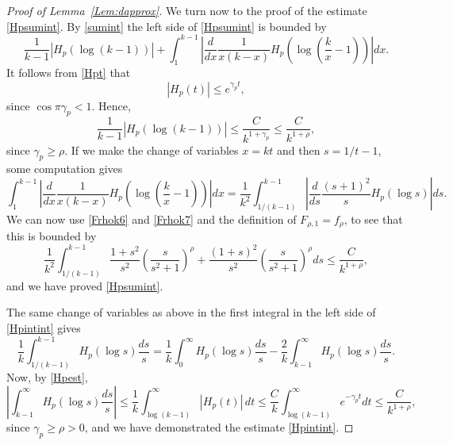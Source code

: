 \documentclass{article}
\numberwithin{equation}{section}
\numberwithin{figure}{section}
\theoremstyle{plain}
\theoremstyle{plain}
\numberwithin{thm}{section}
\theoremstyle{remark}
\let \le \leqslant
\let \ge \geqslant
\begin{document}
\begin{proof}[Proof of Lemma~\ref{Lem:dapprox}]
We turn now to the proof of the estimate \eqref{Hpsumint}. By \eqref{sumint} the left side of \eqref{Hpsumint} is bounded by
\begin{equation*}
    \frac 1{k-1}|H_p(\log(k-1))|+\int_1^{k-1}\left|\frac{d}{dx}\frac 1{x(k-x)}H_p(\log(\frac kx-1))\right|dx.
\end{equation*}
It follows from \eqref{Hpt} that
\begin{equation}\label{Hpest}
    |H_p(t)|\le e^{\gamma_pt},
\end{equation}
since $\cos\pi\gamma_p<1$. Hence,
\begin{equation*}
 \frac 1{k-1}|H_p(\log(k-1))|\le \frac{C}{k^{1+\gamma_p}}\le\frac{C}{k^{1+\rho}},   
\end{equation*}
since $\gamma_p\ge \rho$. If we make the change of variables $x=kt$ and then $s=1/t-1$, some computation gives
\begin{equation*}
 \int_1^{k-1}\left|\frac{d}{dx}\frac 1{x(k-x)}H_p(\log(\frac kx-1))\right|dx=\frac 1{k^2}\int_{1/(k-1)}^{k-1}\left|\frac{d}{ds}\frac{(s+1)^2}{s}H_p(\log s)\right|ds.
\end{equation*}
We can now use \eqref{Frhok6} and \eqref{Frhok7} and the definition of $F_{\rho,1}=f_\rho$, to see that this is bounded by
\begin{equation*}
    \frac 1{k^2}\int_{1/(k-1)}^{k-1}\frac{1+s^2}{s^2}\left(\frac{s}{s^2+1}\right)^\rho+\frac{(1+s)^2}{s^2}\left(\frac{s}{s^2+1}\right)^\rho ds\le \frac{C}{k^{1+\rho}},
\end{equation*}
and we have proved \eqref{Hpsumint}.

The same change of variables as above in the first integral in the left side of \eqref{Hpintint} gives
\begin{equation*}
    \frac 1k\int_{1/(k-1)}^{k-1} H_p(\log s)\frac{ds}{s}=\frac 1k\int_0^\infty H_p(\log s)\frac{ds}{s}-\frac 2k\int_{k-1}^\infty H_p(\log s)\frac{ds}{s}.
\end{equation*}
Now, by \eqref{Hpest},
\begin{equation*}
    \left|\int_{k-1}^\infty H_p(\log s)\frac{ds}{s}\right|\le\frac 1k\int_{\log(k-1)}^\infty |H_p(t)|\,dt\le\frac Ck\int_{\log(k-1)}^\infty e^{-\gamma_pt}dt\le\frac{C}{k^{1+\rho}},
\end{equation*}
since $\gamma_p\ge\rho>0$, and we have demonstrated the estimate \eqref{Hpintint}.
\end{proof}
\end{document}
